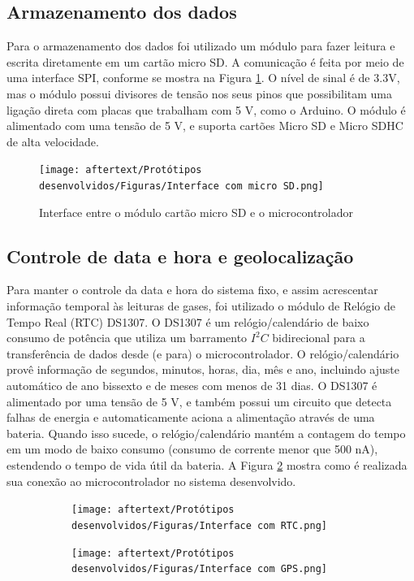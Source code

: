 \subsection{Armazenamento dos dados}
Para o armazenamento dos dados foi utilizado um módulo para fazer leitura e escrita diretamente em um cartão micro SD. A comunicação é feita por meio de uma interface SPI, conforme se mostra na Figura \ref{fig:interface-SD}. O nível de sinal é de 3.3V, mas o módulo possui divisores de tensão nos seus pinos que possibilitam uma ligação direta com placas que trabalham com 5 V, como o Arduino. O módulo é alimentado com uma tensão de 5 V, e suporta cartões Micro SD e Micro SDHC de alta velocidade.

\begin{figure}[h]
    \centering
    \caption{Interface entre o módulo cartão micro SD e o microcontrolador}
    \texttt{[image: aftertext/Protótipos desenvolvidos/Figuras/Interface com micro SD.png]}
    \label{fig:interface-SD}
\end{figure}

\subsection{Controle de data e hora e geolocalização}
Para manter o controle da data e hora do sistema fixo, e assim acrescentar informação temporal às leituras de gases, foi utilizado o módulo de Relógio de Tempo Real (RTC) DS1307. O DS1307 é um relógio/calendário de baixo consumo de potência que utiliza um barramento $I^2C$ bidirecional para a transferência de dados desde (e para) o microcontrolador. O relógio/calendário provê informação de segundos, minutos, horas, dia, mês e ano, incluindo ajuste automático de ano bissexto e de meses com menos de 31 dias. O DS1307 é alimentado por uma tensão de 5 V, e também possui um circuito que detecta falhas de energia e automaticamente aciona a alimentação através de uma bateria. Quando isso sucede, o relógio/calendário mantém a contagem do tempo em um modo de baixo consumo (consumo de corrente menor que 500 nA), estendendo o tempo de vida útil da bateria. A Figura \ref{fig:interface-rtc} mostra como é realizada sua conexão ao microcontrolador no sistema desenvolvido.

\begin{figure}[h]
    \centering
    \caption{Interface entre o microcontrolador e os módulos a) RTC e b) GPS}
    \begin{subfigure}{0.49\textwidth}
        \texttt{[image: aftertext/Protótipos desenvolvidos/Figuras/Interface com RTC.png]}
        \caption{}
        \label{fig:interface-rtc}
    \end{subfigure}
    \hfill
    \begin{subfigure}{0.49\textwidth}
        \texttt{[image: aftertext/Protótipos desenvolvidos/Figuras/Interface com GPS.png]}
        \caption{}
        \label{fig:interface-gps}
    \end{subfigure}
    \hfill
    \label{fig:interface-RTC_GPS}
\end{figure}

